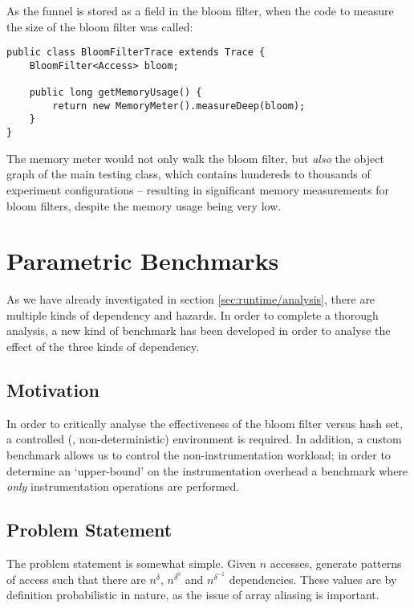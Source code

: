 	As the funnel is stored as a field in the bloom filter, when the code to measure the size of the bloom filter was called:
	
	\begin{lstlisting}
public class BloomFilterTrace extends Trace {
    BloomFilter<Access> bloom;
    
    public long getMemoryUsage() {
        return new MemoryMeter().measureDeep(bloom);
    }
}\end{lstlisting}

	The memory meter would not only walk the bloom filter, but \emph{also} the object graph of the main testing class, which contains hundereds to thousands of experiment configurations -- resulting in significant memory measurements for bloom filters, despite the memory usage being very low.
	
\section{Parametric Benchmarks} \label{sec:methodology/params}
As we have already investigated in section \ref{sec:runtime/analysis}, there are multiple kinds of dependency and hazards. In order to complete a thorough analysis, a new kind of benchmark has been developed in order to analyse the effect of the three kinds of dependency.

	\subsection{Motivation} \label{sec:methodology/params/motivation}
	In order to critically analyse the effectiveness of the bloom filter versus hash set, a controlled (\ie, non-deterministic) environment is required. In addition, a custom benchmark allows us to control the non-instrumentation workload; in order to determine an `upper-bound' on the instrumentation overhead a benchmark where \emph{only} instrumentation operations are performed. 

	\subsection{Problem Statement} \label{sec:methodology/params/problem}
	The problem statement is somewhat simple. Given $n$ accesses, generate patterns of access such that there are $n^{\delta}$, $n^{\delta^{0}}$ and $n^{\delta^{-1}}$ dependencies. These values are by definition probabilistic in nature, as the issue of array aliasing is important.
	
